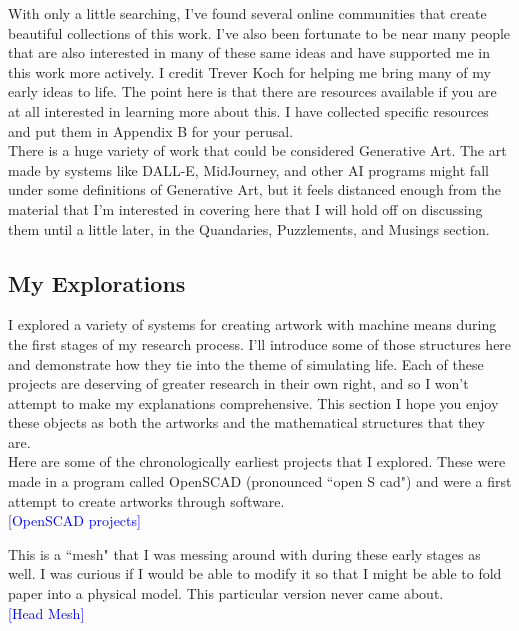 \documentclass[12pt,twoside]{reedthesis}
\begin{document}
	With only a little searching, I've found several online communities that create beautiful collections of this work. I've also been fortunate to be near many people that are also interested in many of these same ideas and have supported me in this work more actively. I credit Trever Koch for helping me bring many of my early ideas to life. The point here is that there are resources available if you are at all interested in learning more about this. I have collected specific resources and put them in Appendix B for your perusal.\\
	
	There is a huge variety of work that could be considered Generative Art. The art made by systems like DALL-E, MidJourney, and other AI programs might fall under some definitions of Generative Art, but it feels distanced enough from the material that I'm interested in covering here that I will hold off on discussing them until a little later, in the Quandaries, Puzzlements, and Musings section.\\
	
\subsection{My Explorations} %
	
	I explored a variety of systems for creating artwork with machine means during the first stages of my research process. I'll introduce some of those structures here and demonstrate how they tie into the theme of simulating life. Each of these projects are deserving of greater research in their own right, and so I won't attempt to make my explanations comprehensive. This section I hope you enjoy these objects as both the artworks and the mathematical structures that they are.\\

	Here are some of the chronologically earliest projects that I explored. These were made in a program called OpenSCAD (pronounced ``open S cad") and were a first attempt to create artworks through software.\\
	\textcolor{blue}{[OpenSCAD projects]}
	
	This is a ``mesh" that I was messing around with during these early stages as well. I was curious if I would be able to modify it so that I might be able to fold paper into a physical model. This particular version never came about.\\
	\textcolor{blue}{[Head Mesh]}
	
\end{document}
